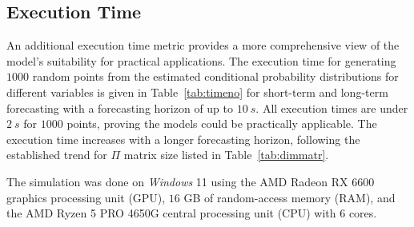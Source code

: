 \documentclass[preprint,12pt]{elsarticle}
\begin{document}
\subsection{Execution Time}

An additional execution time metric provides a more comprehensive view of the model's suitability for practical applications. The execution time for generating $1000$ random points from the estimated conditional probability distributions for different variables is given in Table~\ref{tab:timeno} for short-term and long-term forecasting with a forecasting horizon of up to $10 \ s$. All execution times are under $2 \ s$ for $1000$ points, proving the models could be practically applicable. The execution time increases with a longer forecasting horizon, following the established trend for $\Pi$ matrix size listed in Table~\ref{tab:dimmatr}.

The simulation was done on \textit{Windows} 11 using the AMD Radeon RX 6600 graphics processing unit (GPU), $16$ GB of random-access memory (RAM), and the AMD Ryzen 5 PRO 4650G central processing unit (CPU) with $6$ cores.
\end{document}
